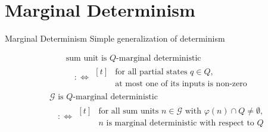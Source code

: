 \documentclass[aspectratio=169]{beamer}
\begin{document}
\section{Marginal Determinism}
  \begin{frame}{Marginal Determinism}
    Simple generalization of determinism
    \medskip
    \onslide<+->
    \begin{mybox}
      \onslide<+->
      \begin{align*}
        &\text{sum unit is $Q$-marginal deterministic} \\
        &\text{$\quad:\iff$}
        \begin{aligned}[t]
          &\text{for all partial states $q\in Q$,} \\
          &\text{at most one of its inputs is non-zero}
        \end{aligned}
      \end{align*}
      \onslide<+->
      \begin{align*}
        &\text{$\mathscr{G}$ is $Q$-marginal deterministic} \\
        &\text{$\quad:\iff$}
        \begin{aligned}[t]
          &\text{for all sum units $n\in\mathscr{G}$ with $φ(n)\cap Q\neq\emptyset$,} \\
          &\text{$n$ is marginal deterministic with respect to $Q$}
        \end{aligned}
      \end{align*}
    \end{mybox}
  \end{frame}
\end{document}
